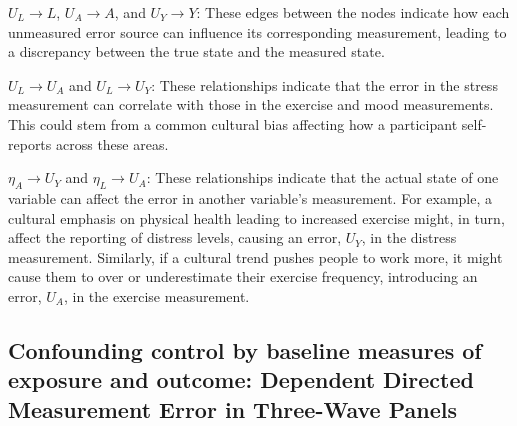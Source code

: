 \documentclass[
  singlecolumn]{report}
\begin{document}
\(U_{L} \rightarrow L\), \(U_{A} \rightarrow A\), and
\(U_{Y} \rightarrow Y\): These edges between the nodes indicate how each
unmeasured error source can influence its corresponding measurement,
leading to a discrepancy between the true state and the measured state.

\(U_{L} \rightarrow U_{A}\) and \(U_{L} \rightarrow U_{Y}\): These
relationships indicate that the error in the stress measurement can
correlate with those in the exercise and mood measurements. This could
stem from a common cultural bias affecting how a participant
self-reports across these areas.

\(\eta_A \rightarrow U_{Y}\) and \(\eta_L \rightarrow U_{A}\): These
relationships indicate that the actual state of one variable can affect
the error in another variable's measurement. For example, a cultural
emphasis on physical health leading to increased exercise might, in
turn, affect the reporting of distress levels, causing an error,
\(U_{Y}\), in the distress measurement. Similarly, if a cultural trend
pushes people to work more, it might cause them to over or underestimate
their exercise frequency, introducing an error, \(U_{A}\), in the
exercise measurement.

\hypertarget{confounding-control-by-baseline-measures-of-exposure-and-outcome-dependent-directed-measurement-error-in-three-wave-panels}{%
\subsection{Confounding control by baseline measures of exposure and
outcome: Dependent Directed Measurement Error in Three-Wave
Panels}\label{confounding-control-by-baseline-measures-of-exposure-and-outcome-dependent-directed-measurement-error-in-three-wave-panels}}
\end{document}
